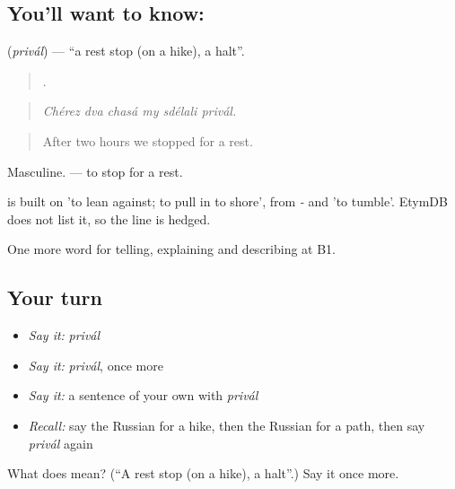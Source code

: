 \subsection*{You'll want to know: }
\textbf{} (\emph{privál}) — \textquotedblleft{}a rest stop (on a hike), a halt\textquotedblright{}.

\begin{quote}
     .
\end{quote}

\begin{quote}
\emph{Chérez dva chasá my sdélali privál.}
\end{quote}

\begin{quote}
After two hours we stopped for a rest.
\end{quote}

Masculine. \emph{ } — to stop for a rest.

\begin{cousinweb}
\emph{} is built on \emph{} 'to lean against; to pull in to shore', from \emph{-} and \emph{} 'to tumble'. EtymDB does not list it, so the line is hedged.
\end{cousinweb}

\begin{grammarlens}[title={What you've built}]
One more word for telling, explaining and describing at B1.
\end{grammarlens}

\subsection*{Your turn}
\begin{itemize}
\raggedright
  \item \emph{Say it:} \emph{privál}
  \item \emph{Say it:} \emph{privál}, once more
  \item \emph{Say it:} a sentence of your own with \emph{privál}
  \item \emph{Recall:} say the Russian for a hike, then the Russian for a path, then say \emph{privál} again
\end{itemize}

\begin{tcolorbox}[breakable,colback=teal!4,colframe=teal!35!black,title={Before you move on}]
What does  mean? (\textquotedblleft{}A rest stop (on a hike), a halt\textquotedblright{}.) Say it once more.
\end{tcolorbox}

